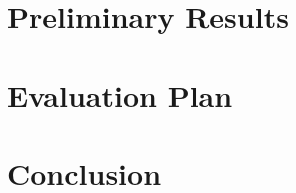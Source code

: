 \documentclass{llncs}
\begin{document}
\section{Preliminary Results}

\section{Evaluation Plan}

\section{Conclusion}




\end{document}
